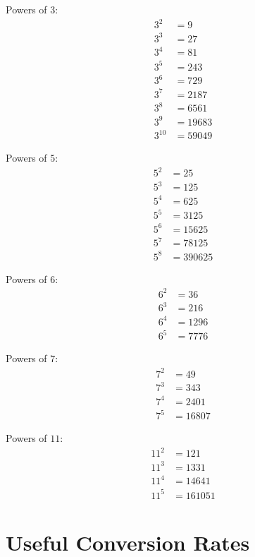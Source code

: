 \documentclass[12pt]{article}
\begin{document}
Powers of $3$:
\begin{align*}
3^2    & = 9\\
3^3    & = 27\\
3^4    & = 81\\
3^5    & = 243\\
3^6    & = 729\\
3^7    & = 2187\\
3^8    & = 6561\\
3^9    & = 19683\\
3^{10} & = 59049
\end{align*}

Powers of $5$:
\begin{align*}
5^2    & = 25\\
5^3    & = 125\\
5^4    & = 625\\
5^5    & = 3125\\
5^6    & = 15625\\
5^7    & = 78125\\
5^8    & = 390625
\end{align*}

Powers of $6$:
\begin{align*}
6^2    & = 36\\
6^3    & = 216\\
6^4    & = 1296\\
6^5    & = 7776
\end{align*}

Powers of $7$:
\begin{align*}
7^2    & = 49\\
7^3    & = 343\\
7^4    & = 2401\\
7^5    & = 16807
\end{align*}

Powers of $11$:
\begin{align*}
11^2    & = 121\\
11^3    & = 1331\\
11^4    & = 14641\\
11^5    & = 161051
\end{align*}

\newpage

\section*{Useful Conversion Rates}
\end{document}
